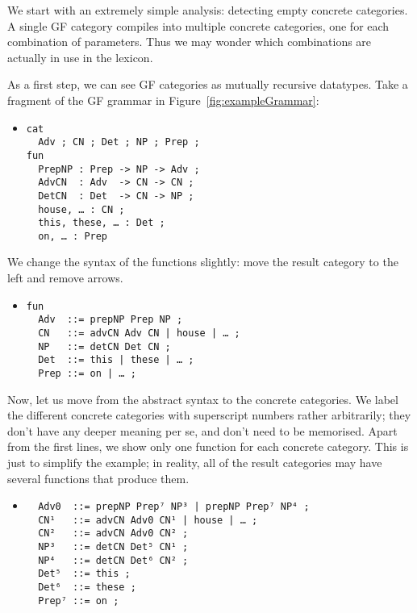 We start with an extremely simple analysis: detecting empty concrete
categories. A single GF category compiles into multiple concrete
categories, one for each combination of parameters. Thus we may wonder
which combinations are actually in use in the lexicon.

As a first step, we can see GF categories as mutually recursive
datatypes. Take a fragment of the GF grammar in Figure~\ref{fig:exampleGrammar}:

\begin{itemize}
\item[] 
\begin{verbatim}
cat
  Adv ; CN ; Det ; NP ; Prep ;
fun
  PrepNP : Prep -> NP -> Adv ;
  AdvCN  : Adv  -> CN -> CN ;
  DetCN  : Det  -> CN -> NP ;
  house, … : CN ;
  this, these, … : Det ;
  on, … : Prep
\end{verbatim}
\end{itemize}

We change the syntax of the functions slightly: move the result
category to the left and remove arrows.

\begin{itemize}
\item[]
\begin{verbatim}
fun
  Adv  ::= prepNP Prep NP ;
  CN   ::= advCN Adv CN | house | … ;
  NP   ::= detCN Det CN ;
  Det  ::= this | these | … ;
  Prep ::= on | … ;
\end{verbatim}
\end{itemize}


Now, let us move from the \gf abstract syntax to the \pmcfg concrete
categories. We label the different concrete categories with
superscript numbers rather arbitrarily; they don't have any deeper
meaning per se, and don't need to be memorised. Apart from the first
lines, we show only one function for each concrete category. This is
just to simplify the example; in reality, all of the result categories
may have several functions that produce them.

\begin{itemize}
\item[]
\begin{verbatim}
  Adv0  ::= prepNP Prep⁷ NP³ | prepNP Prep⁷ NP⁴ ;
  CN¹   ::= advCN Adv0 CN¹ | house | … ;
  CN²   ::= advCN Adv0 CN² ;
  NP³   ::= detCN Det⁵ CN¹ ;
  NP⁴   ::= detCN Det⁶ CN² ;
  Det⁵  ::= this ;
  Det⁶  ::= these ;
  Prep⁷ ::= on ;
\end{verbatim}
\end{itemize}

